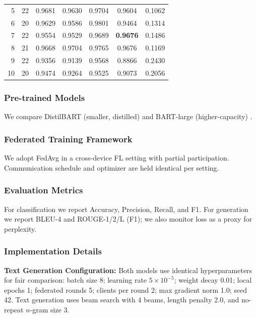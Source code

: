 \documentclass[conference]{IEEEtran}
\begin{document}
\begin{table}[t]
{\begin{minipage}[t]{0.48\textwidth}
\begin{tabular}{rcccccc}
            5  & 22 & 0.9681 & 0.9630 & 0.9704 & 0.9604 & 0.1062 \\
            6  & 20 & 0.9629 & 0.9586 & 0.9801 & 0.9464 & 0.1314 \\
            7  & 22 & 0.9554 & 0.9529 & 0.9689 & \textbf{0.9676} & 0.1486 \\
            8  & 21 & 0.9668 & 0.9704 & 0.9765 & 0.9676 & 0.1169 \\
            9  & 22 & 0.9356 & 0.9139 & 0.9568 & 0.8866 & 0.2430 \\
            10 & 20 & 0.9474 & 0.9264 & 0.9525 & 0.9073 & 0.2056 \\
            \hline
        \end{tabular}
    \end{minipage}}
\end{table}

\subsubsection{Pre-trained Models}
We compare DistilBART (smaller, distilled) and BART-large (higher-capacity) \cite{lewis2020bart,shleifer2020distilbart}.

\subsubsection{Federated Training Framework}
We adopt FedAvg in a cross-device FL setting with partial participation. Communication schedule and optimizer are held identical per setting.

\subsubsection{Evaluation Metrics}
For classification we report Accuracy, Precision, Recall, and F1. For generation we report BLEU-4 and ROUGE-1/2/L (F1); we also monitor loss as a proxy for perplexity.

\subsubsection{Implementation Details}
\textbf{Text Generation Configuration:} Both models use identical hyperparameters for fair comparison: batch size 8; learning rate $5\times10^{-5}$; weight decay 0.01; local epochs 1; federated rounds 5; clients per round 2; max gradient norm 1.0; seed 42. Text generation uses beam search with 4 beams, length penalty 2.0, and no-repeat $n$-gram size 3. 
\end{document}
